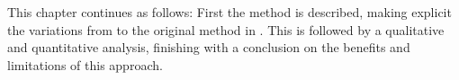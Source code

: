 This chapter continues as follows: First the method is described, making explicit the variations from to the original method in \cite {Derrac2015}. This is followed by a qualitative  and quantitative analysis, finishing with a conclusion on the  benefits and limitations of this approach.
















